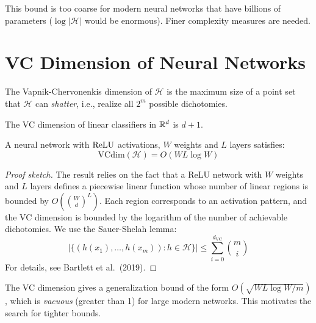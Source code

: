 \begin{remark}
This bound is too coarse for modern neural networks
that have billions of parameters ($\log|\mathcal{H}|$ would be enormous).
Finer complexity measures are needed.
\end{remark}

\section{VC Dimension of Neural Networks}
\label{sec:vc-dimension}

\begin{definition}[VC Dimension]
\label{def:vc-dim}
The Vapnik-Chervonenkis dimension of $\mathcal{H}$ is the maximum size
of a point set that $\mathcal{H}$ can \emph{shatter},
i.e., realize all $2^m$ possible dichotomies.
\end{definition}

\begin{proposition}
\label{prop:vc-linear}
The VC dimension of linear classifiers in $\mathbb{R}^d$ is $d + 1$.
\end{proposition}

\begin{theorem}
\label{thm:vc-relu}
A neural network with $\mathrm{ReLU}$ activations, $W$ weights and $L$ layers
satisfies:
\begin{equation}
\text{VCdim}(\mathcal{H}) = O(WL\log W)
\end{equation}
\end{theorem}

\begin{proof}[Proof sketch]
The result relies on the fact that a ReLU network with $W$ weights and $L$
layers defines a piecewise linear function whose number of linear
regions is bounded by $O\!\left(\binom{W}{d}^L\right)$.
Each region corresponds to an activation pattern, and the VC dimension
is bounded by the logarithm of the number of achievable dichotomies.
We use the Sauer-Shelah lemma:
\begin{equation}
|\{(h(x_1), \ldots, h(x_m)) : h \in \mathcal{H}\}| \leq \sum_{i=0}^{d_{\text{VC}}} \binom{m}{i}
\end{equation}
For details, see Bartlett et al.\ (2019).
\end{proof}

\begin{warning}
The VC dimension gives a generalization bound of the form
$O\!\left(\sqrt{WL\log W / m}\right)$, which is \emph{vacuous} (greater
than 1) for large modern networks. This motivates the search for
tighter bounds.
\end{warning}

